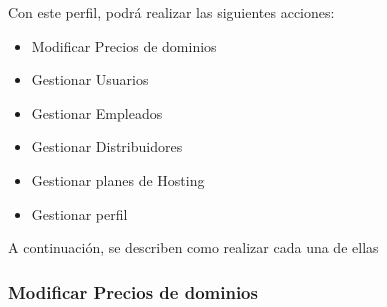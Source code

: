 Con este perfil, podrá realizar las siguientes acciones:

\begin{itemize}
    \item{Modificar Precios de dominios}
    \item{Gestionar Usuarios}
    \item{Gestionar Empleados}
    \item{Gestionar Distribuidores}
    \item{Gestionar planes de Hosting}
    \item{Gestionar perfil}
\end{itemize}

A continuación, se describen como realizar cada una de ellas

\subsubsection{Modificar Precios de dominios}
